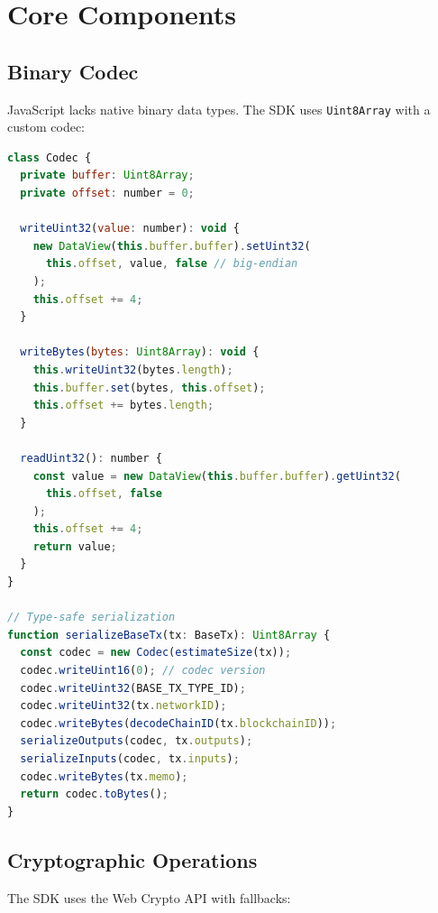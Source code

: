 \documentclass[11pt,twocolumn]{article}
\begin{document}
\section{Core Components}

\subsection{Binary Codec}

JavaScript lacks native binary data types. The SDK uses \texttt{Uint8Array} with a custom codec:

\begin{lstlisting}[language=JavaScript,caption=Codec Implementation]
class Codec {
  private buffer: Uint8Array;
  private offset: number = 0;

  writeUint32(value: number): void {
    new DataView(this.buffer.buffer).setUint32(
      this.offset, value, false // big-endian
    );
    this.offset += 4;
  }

  writeBytes(bytes: Uint8Array): void {
    this.writeUint32(bytes.length);
    this.buffer.set(bytes, this.offset);
    this.offset += bytes.length;
  }

  readUint32(): number {
    const value = new DataView(this.buffer.buffer).getUint32(
      this.offset, false
    );
    this.offset += 4;
    return value;
  }
}

// Type-safe serialization
function serializeBaseTx(tx: BaseTx): Uint8Array {
  const codec = new Codec(estimateSize(tx));
  codec.writeUint16(0); // codec version
  codec.writeUint32(BASE_TX_TYPE_ID);
  codec.writeUint32(tx.networkID);
  codec.writeBytes(decodeChainID(tx.blockchainID));
  serializeOutputs(codec, tx.outputs);
  serializeInputs(codec, tx.inputs);
  codec.writeBytes(tx.memo);
  return codec.toBytes();
}
\end{lstlisting}

\subsection{Cryptographic Operations}

The SDK uses the Web Crypto API with fallbacks:
\end{document}
